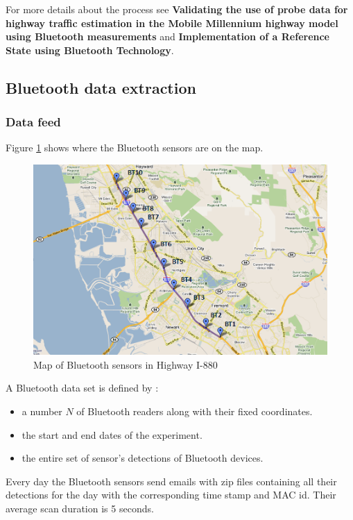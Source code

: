 \documentclass[letterpaper,10pt]{article}
\begin{document}
\bigskip
For more details about the process see \textbf{Validating the use of probe data for highway traffic estimation in the Mobile Millennium highway model using Bluetooth measurements} and \textbf{Implementation of a Reference State using Bluetooth Technology}.

\subsection{Bluetooth data extraction}

\subsubsection{Data feed\label{sec:datafeed}}

Figure \ref{fig:btMap} shows where the Bluetooth sensors are on the map.

\begin{figure}
\centering
\includegraphics[width=12cm]{figures/btI880Map.png}
    \caption{Map of Bluetooth sensors in Highway I-880}
    \label{fig:btMap}
\end{figure}

\bigskip
A Bluetooth data set is defined by :
\begin{itemize}
\item a number $N$ of Bluetooth readers along with their fixed coordinates.
\item the start and end dates of the experiment.
\item the entire set of sensor's detections of Bluetooth devices.
\end{itemize}
Every day the Bluetooth sensors send emails with zip files containing all their detections for the day with the corresponding time stamp and MAC id. Their average scan duration is 5 seconds.
\end{document}
